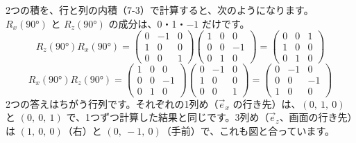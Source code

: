 2つの積を、行と列の内積（7-3）で計算すると、次のようになります。$R_x(90°)$ と $R_z(90°)$ の成分は、0・1・$-1$ だけです。
\[R_z(90°)R_x(90°)=\begin{pmatrix}0&-1&0\\1&0&0\\0&0&1\end{pmatrix}\begin{pmatrix}1&0&0\\0&0&-1\\0&1&0\end{pmatrix}=\begin{pmatrix}0&0&1\\1&0&0\\0&1&0\end{pmatrix}\]
\[R_x(90°)R_z(90°)=\begin{pmatrix}1&0&0\\0&0&-1\\0&1&0\end{pmatrix}\begin{pmatrix}0&-1&0\\1&0&0\\0&0&1\end{pmatrix}=\begin{pmatrix}0&-1&0\\0&0&-1\\1&0&0\end{pmatrix}\]
2つの答えはちがう行列です。それぞれの1列め（$\vec e_x$ の行き先）は、$(0,\ 1,\ 0)$ と $(0,\ 0,\ 1)$ で、1つずつ計算した結果と同じです。3列め（$\vec e_z$、画面の行き先）は $(1,\ 0,\ 0)$（右）と $(0,\ -1,\ 0)$（手前）で、これも図と合っています。

